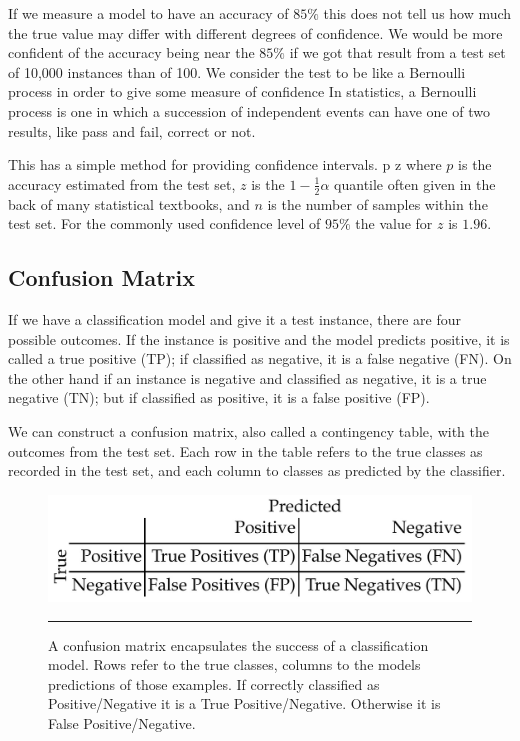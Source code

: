 If we measure a model to have an accuracy of $85\%$ this does not tell us how much the true value may differ with different degrees of confidence.
We would be more confident of the accuracy being near the $85\%$ if we got that result from a test set of 10,000 instances than of 100.
We consider the test to be like a Bernoulli process in order to give some measure of confidence
In statistics, a Bernoulli process is one in which a succession of independent events can have one of two results, like pass and fail, correct or not. 

This has a simple method for providing confidence intervals\citep{witten2005data}.
\be
p \pm z 
\ee
where $p$ is the accuracy estimated from the test set, $z$ is the $1-\frac{1}{2}\alpha$ quantile often given in the back of many statistical textbooks, and $n$ is the number of samples within the test set.
For the commonly used confidence level of $95\%$ the value for $z$ is $1.96$.

	\subsection{Confusion Matrix} 
    
If we have a classification model and give it a test instance, there are four possible outcomes. 
If the instance is positive and the model predicts positive, it is called a true positive (TP); if classified as negative, it is a false negative (FN). 
On the other hand if an instance is negative and classified as negative, it is a true negative (TN); but if classified as positive, it is a false positive (FP). 

We can construct a confusion matrix, also called a contingency table, with the outcomes from the test set.
Each row in the table refers to the true classes as recorded in the test set, and each column to classes as predicted by the classifier\citep{flach2012machine}. 

\begin{figure}[htbp]
	\centering
		\includegraphics{./Figures/confusion_matrix.jpg}
		\rule{35em}{0.5pt}
	\caption[Confusion Matrix]{A confusion matrix encapsulates the success of a classification model. Rows refer to the true classes, columns to the models predictions of those examples.
	If correctly classified as Positive/Negative it is a True Positive/Negative. Otherwise it is False Positive/Negative.}
	\label{fig:confusion_matrix}
\end{figure}

